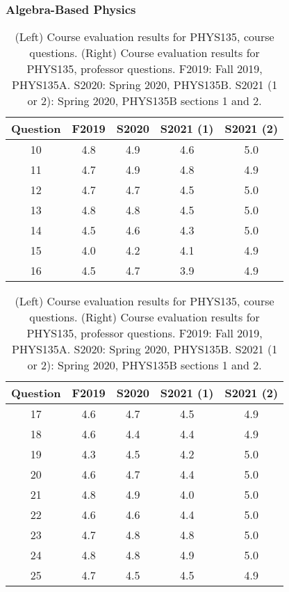 \documentclass[../../main.tex]{subfiles}
\begin{document}
\subsubsection{Algebra-Based Physics}

\begin{table}
\footnotesize
\centering
\begin{tabular}{| c | c | c | c | c |}
\hline
\hline
Question & F2019 & S2020 & S2021 (1) & S2021 (2) \\ \hline
10 & 4.8 & 4.9 & 4.6 & 5.0 \\ \hline
11 & 4.7 & 4.9 & 4.8 & 4.9 \\ \hline
12 & 4.7 & 4.7 & 4.5 & 5.0 \\ \hline
13 & 4.8 & 4.8 & 4.5 & 5.0 \\ \hline
14 & 4.5 & 4.6 & 4.3 & 5.0 \\ \hline
15 & 4.0 & 4.2 & 4.1 & 4.9 \\ \hline
16 & 4.5 & 4.7 & 3.9 & 4.9 \\ \hline
\hline
\end{tabular}
\begin{tabular}{| c | c | c | c | c |}
\hline
\hline
Question & F2019 & S2020 & S2021 (1) & S2021 (2) \\ \hline
17 & 4.6 & 4.7 & 4.5 & 4.9 \\ \hline
18 & 4.6 & 4.4 & 4.4 & 4.9 \\ \hline
19 & 4.3 & 4.5 & 4.2 & 5.0 \\ \hline
20 & 4.6 & 4.7 & 4.4 & 5.0 \\ \hline
21 & 4.8 & 4.9 & 4.0 & 5.0 \\ \hline
22 & 4.6 & 4.6 & 4.4 & 5.0 \\ \hline
23 & 4.7 & 4.8 & 4.8 & 5.0 \\ \hline
24 & 4.8 & 4.8 & 4.9 & 5.0 \\ \hline
25 & 4.7 & 4.5 & 4.5 & 4.9 \\ \hline
\hline
\end{tabular}
\caption{\label{tab:eval_135} (Left) Course evaluation results for PHYS135, course questions.  (Right) Course evaluation results for PHYS135, professor questions.  F2019: Fall 2019, PHYS135A.  S2020: Spring 2020, PHYS135B.  S2021 (1 or 2): Spring 2020, PHYS135B sections 1 and 2.}
\end{table}
\end{document}
